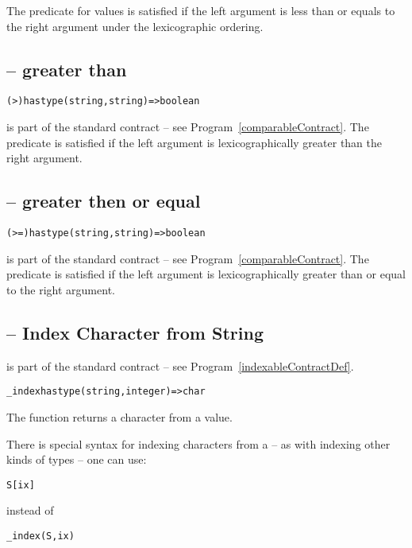 The \q{<=} predicate for  values is satisfied if the left argument is less than or equals to the right argument under the lexicographic ordering.

\subsection{\q{>} -- greater than}
\begin{alltt}
(>) has type (string,string)=>boolean
\end{alltt}
\q{(>)} is part of the standard  contract -- see Program~\vref{comparableContract}.
The \q{>} predicate is satisfied if the left argument is lexicographically greater than the right argument.

\subsection{\q{>=} -- greater then or equal}
\begin{alltt}
(>=) has type (string,string)=>boolean
\end{alltt}
\q{(>=)} is part of the standard  contract -- see Program~\vref{comparableContract}.
The \q{>=} predicate is satisfied if the left argument is lexicographically greater than or equal to the right argument.

\subsection{ -- Index Character from String}
\label{indexString}
 is part of the standard  contract -- see Program~\vref{indexableContractDef}.
\begin{alltt}
_index has type (string,integer)=>char
\end{alltt}
The  function returns a character from a  value.

There is special syntax for indexing characters from a  -- as with indexing other kinds of  types -- one can use:
\begin{alltt}
S[ix]
\end{alltt}
instead of
\begin{alltt}
_index(S,ix)
\end{alltt}


